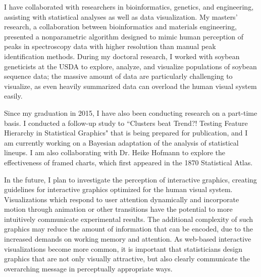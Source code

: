 \documentclass[12pt, letterpaper, sans]{moderncv}
\begin{document}
I have collaborated with researchers in bioinformatics, genetics, and engineering, assisting with statistical analyses as well as data visualization. My masters' research, a collaboration between bioinformatics and materials engineering, presented a nonparametric algorithm designed to mimic human perception of peaks in spectroscopy data with higher resolution than manual peak identification methods. During my doctoral research, I worked with soybean geneticists at the USDA to explore, analyze, and visualize populations of soybean sequence data; the massive amount of data are particularly challenging to visualize, as even heavily summarized data can overload the human visual system easily. 

Since my graduation in 2015, I have also been conducting research on a part-time basis. I conducted a follow-up study to ``Clusters beat Trend?! Testing Feature Hierarchy in Statistical Graphics" that is being prepared for publication, and I am currently working on a Bayesian adaptation of the analysis of statistical lineups. I am also collaborating with Dr. Heike Hofmann to explore the effectiveness of framed charts, which first appeared in the 1870 Statistical Atlas. 

In the future, I plan to investigate the perception of interactive graphics, creating guidelines for interactive graphics optimized for the human visual system. Visualizations which respond to user attention dynamically and incorporate motion through animation or other transitions have the potential to more intuitively communicate experimental results. The additional complexity of such graphics may reduce the amount of information that can be encoded, due to the increased demands on working memory and attention. As web-based interactive visualizations become more common, it is important that statisticians design graphics that are not only visually attractive, but also clearly communicate the overarching message in perceptually appropriate ways. 
\end{document}
